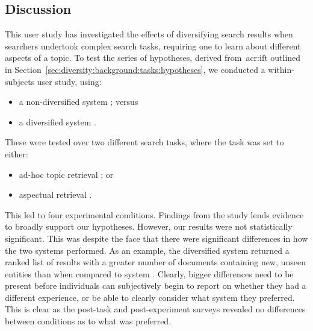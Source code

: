 \vspace*{-6mm}
\subsection{Discussion}\label{sec:diversity:users:discussion}
This user study has investigated the effects of diversifying search results when searchers undertook complex search tasks, requiring one to learn about different aspects of a topic. To test the series of hypotheses, derived from~\gls{acr:ift} outlined in Section~\ref{sec:diversity:background:tasks:hypotheses}, we conducted a within-subjects user study, using:

\begin{itemize}
    \item{a non-diversified system ; versus}
    \item{a diversified system .}
\end{itemize}

These were tested over two different search tasks, where the task was set to either:

\begin{itemize}
    \item{ad-hoc topic retrieval ; or}
    \item{aspectual retrieval .}
\end{itemize}

This led to four experimental conditions. Findings from the study lends evidence to broadly support our hypotheses. However, our results were not statistically significant. This was despite the face that there were significant differences in how the two systems performed. As an example, the diversified system  returned a ranked list of results with a greater number of documents containing new, unseen entities than when compared to system . Clearly, bigger differences need to be present before individuals can subjectively begin to report on whether they had a different experience, or be able to clearly consider what system they preferred. This is clear as the post-task and post-experiment surveys revealed no differences between conditions as to what was preferred.

